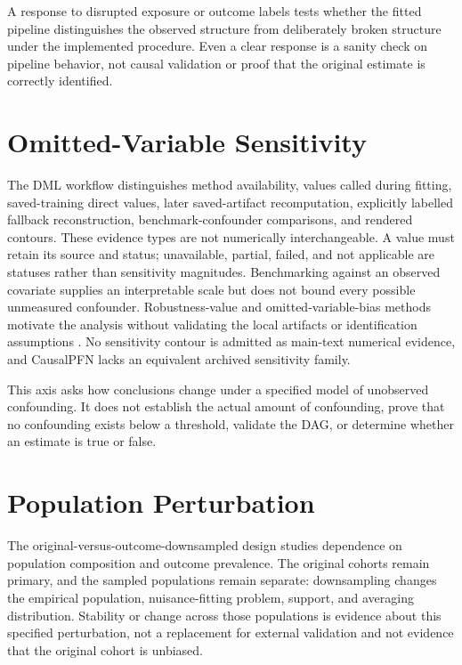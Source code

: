 A response to disrupted exposure or outcome labels tests whether the fitted pipeline distinguishes the observed structure from deliberately broken structure under the implemented procedure.  Even a clear response is a sanity check on pipeline behavior, not causal validation or proof that the original estimate is correctly identified.

\section{Omitted-Variable Sensitivity}
\label{sec:robustness-sensitivity-validation-design:sensitivity-robustness-values}

The DML workflow distinguishes method availability, values called during fitting, saved-training direct values, later saved-artifact recomputation, explicitly labelled fallback reconstruction, benchmark-confounder comparisons, and rendered contours.  These evidence types are not numerically interchangeable.  A value must retain its source and status; unavailable, partial, failed, and not applicable are statuses rather than sensitivity magnitudes.  Benchmarking against an observed covariate supplies an interpretable scale but does not bound every possible unmeasured confounder.  Robustness-value and omitted-variable-bias methods motivate the analysis without validating the local artifacts or identification assumptions \cite{cinelli_hazlett_2020_sensitivity,chernozhukov_et_al_2026_ovb_causal_ml,oprescu_et_al_2019_econml}.  No sensitivity contour is admitted as main-text numerical evidence, and CausalPFN lacks an equivalent archived sensitivity family.

This axis asks how conclusions change under a specified model of unobserved confounding.  It does not establish the actual amount of confounding, prove that no confounding exists below a threshold, validate the DAG, or determine whether an estimate is true or false.

\section{Population Perturbation}

The original-versus-outcome-downsampled design studies dependence on population composition and outcome prevalence.  The original cohorts remain primary, and the sampled populations remain separate: downsampling changes the empirical population, nuisance-fitting problem, support, and averaging distribution.  Stability or change across those populations is evidence about this specified perturbation, not a replacement for external validation and not evidence that the original cohort is unbiased.

